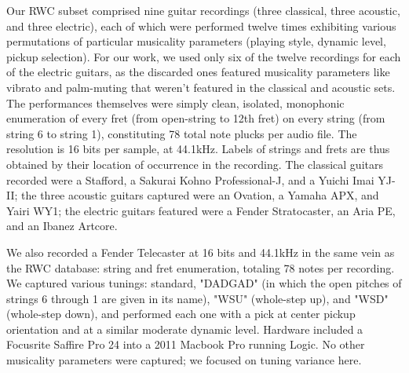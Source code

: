 \documentclass[12pt]{cmuthesis}
\begin{document}
Our RWC subset comprised nine guitar recordings (three classical, three acoustic, and three electric), each of which were performed twelve times exhibiting various permutations of particular musicality parameters (playing style, dynamic level, pickup selection). For our work, we used only six of the twelve recordings for each of the electric guitars, as the discarded ones featured musicality parameters like vibrato and palm-muting that weren't featured in the classical and acoustic sets. The performances themselves were simply clean, isolated, monophonic enumeration of every fret (from open-string to 12th fret) on every string (from string 6 to string 1), constituting 78 total note plucks per audio file. The resolution is 16 bits per sample, at 44.1kHz. Labels of strings and frets are thus obtained by their location of occurrence in the recording. The classical guitars recorded were a Stafford, a Sakurai Kohno Professional-J, and a Yuichi Imai YJ-II; the three acoustic guitars captured were an Ovation, a Yamaha APX, and Yairi WY1; the electric guitars featured were a Fender Stratocaster, an Aria PE, and an Ibanez Artcore.


We also recorded a Fender Telecaster at 16 bits and 44.1kHz in the same vein as the RWC database: string and fret enumeration, totaling 78 notes per recording. We captured various tunings: standard, "DADGAD" (in which the open pitches of strings 6 through 1 are given in its name), "WSU" (whole-step up), and "WSD" (whole-step down), and performed each one with a pick at center pickup orientation and at a similar moderate dynamic level. Hardware included a Focusrite Saffire Pro 24 into a 2011 Macbook Pro running Logic. No other musicality parameters were captured; we focused on tuning variance here.
\end{document}
